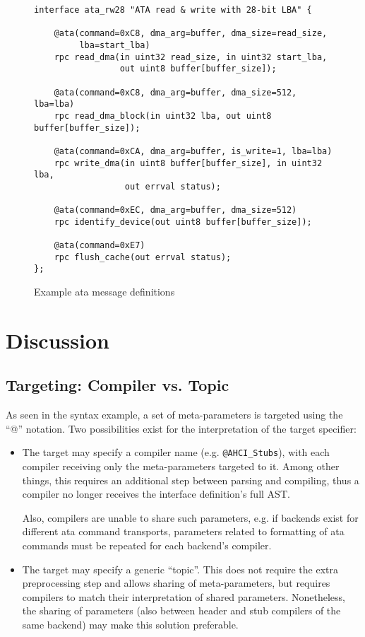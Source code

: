 \begin{figure}[htb]
\begin{center}
\begin{lstlisting}
interface ata_rw28 "ATA read & write with 28-bit LBA" {

    @ata(command=0xC8, dma_arg=buffer, dma_size=read_size,
         lba=start_lba)
    rpc read_dma(in uint32 read_size, in uint32 start_lba,
                 out uint8 buffer[buffer_size]);

    @ata(command=0xC8, dma_arg=buffer, dma_size=512, lba=lba)
    rpc read_dma_block(in uint32 lba, out uint8 buffer[buffer_size]);

    @ata(command=0xCA, dma_arg=buffer, is_write=1, lba=lba)
    rpc write_dma(in uint8 buffer[buffer_size], in uint32 lba,
                  out errval status);

    @ata(command=0xEC, dma_arg=buffer, dma_size=512)
    rpc identify_device(out uint8 buffer[buffer_size]);

    @ata(command=0xE7)
    rpc flush_cache(out errval status);
};
\end{lstlisting}
\caption{Example \acs{ata} message definitions}
\label{fig:flounder-example}
\end{center}
\end{figure}

\section{Discussion}

\subsection{Targeting: Compiler vs. Topic}

As seen in the syntax example, a set of meta-parameters is targeted using the
``@'' notation. Two possibilities exist for the interpretation of the target
specifier:

\begin{itemize}

	\item The target may specify a compiler name (e.g. \verb+@AHCI_Stubs+),
		with each compiler receiving only the meta-parameters targeted to it.
		Among other things, this requires an additional step between parsing
		and compiling, thus a compiler no longer receives the interface
		definition's full AST.

		Also, compilers are unable to share such parameters, e.g. if backends
		exist for different \ac{ata} command transports, parameters related to
		formatting of \ac{ata} commands must be repeated for each backend's
		compiler.

	\item The target may specify a generic ``topic''.  This does not require
		the extra preprocessing step and allows sharing of meta-parameters, but
		requires compilers to match their interpretation of shared parameters.
		Nonetheless, the sharing of parameters (also between header and stub
		compilers of the same backend) may make this solution preferable.

\end{itemize}


